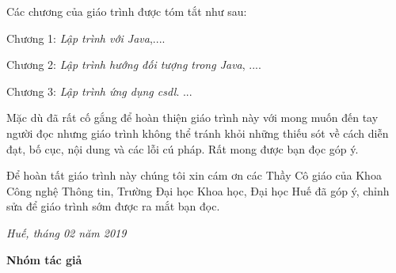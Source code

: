 Các chương của giáo trình được tóm tắt như sau:

Chương 1: \textit{Lập trình với Java},....

Chương 2: \textit{Lập trình hướng đối tượng trong Java}, ....

Chương 3:\textit{ Lập trình ứng dụng csdl}. ...

Mặc dù đã rất cố gắng để hoàn thiện giáo trình này với mong muốn đến tay người đọc nhưng giáo trình không thể tránh khỏi những thiếu sót về cách diễn đạt, bố cục, nội dung và các lỗi cú pháp. Rất mong được bạn đọc góp ý. 

Để hoàn tất giáo trình này chúng tôi xin cám ơn các Thầy Cô giáo của Khoa Công nghệ Thông tin, Trường Đại học Khoa học, Đại học Huế đã góp ý, chỉnh sửa để giáo trình sớm được ra mắt bạn đọc.   

\begin{flushright}
\textit{Huế, tháng 02 năm 2019}
 
\textbf{Nhóm tác giả }
\end{flushright}

\vspace{-0.4cm}


\cleardoublepage
\newpage
\setcounter{tocdepth}{2}
\renewcommand\contentsname{\!\!\!\!\!\!\!\!\!\!\chapterFont\hfill MỤC LỤC\hfill}
\thispagestyle{empty}


